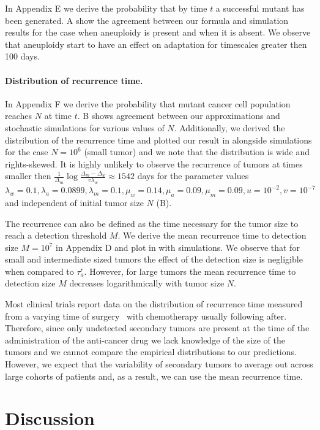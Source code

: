 \documentclass[12pt]{extarticle}
\begin{document}
In Appendix E we derive the probability that by time $t$ a successful mutant has been generated. A show the agreement between our formula and simulation results for the case when aneuploidy is present and when it is absent.  We observe that aneuploidy start to have an effect on adaptation for timescales greater then 100 days.

\paragraph{Distribution of  recurrence time.}
In Appendix F we derive the probability that mutant cancer cell population reaches $N$ at time $t$. B shows agreement between our approximations and stochastic simulations for various values of $N$. Additionally, we derived the distribution of the recurrence time and plotted our result in  alongside simulations for the case $N=10^6$ (small tumor) and we note that the distribution is wide and rights-skewed. It is highly unlikely to observe the recurrence of tumors at times smaller then $\frac{1}{\Delta_m}\log\frac{\Delta_m-\Delta_w}{v\lambda_w}\approx1542$ days for the parameter values $\lambda_w=0.1, \lambda_a=0.0899,\lambda_m=0.1,\mu_w=0.14,\mu_a=0.09,\mu_m=0.09, u=10^{-2}, v=10^{-7}$ and independent of initial tumor size $N$ (B). 

The recurrence can also be defined as the time necessary for the tumor size to reach a detection threshold $M$. We derive the mean recurrence time to detection size $M=10^7$ in Appendix D and plot in  with simulations. We observe that  for small and intermediate sized tumors the effect of the detection size is negligible when compared to $\tau_a^r$. However, for large tumors the mean recurrence time to detection size $M$ decreases logarithmically with tumor size $N$.

Most clinical trials report data on the distribution of recurrence time measured from a varying time of surgery~\citep{avanzini2019cancer} with chemotherapy usually following after. Therefore, since only undetected secondary tumors are present at the time of the administration of the anti-cancer drug we lack knowledge of the size of the tumors and we cannot compare the empirical distributions to our predictions. However, we expect that the variability of secondary tumors to average out across large cohorts of patients and, as a result, we can use the mean recurrence time. 
\section*{Discussion}
\end{document}
